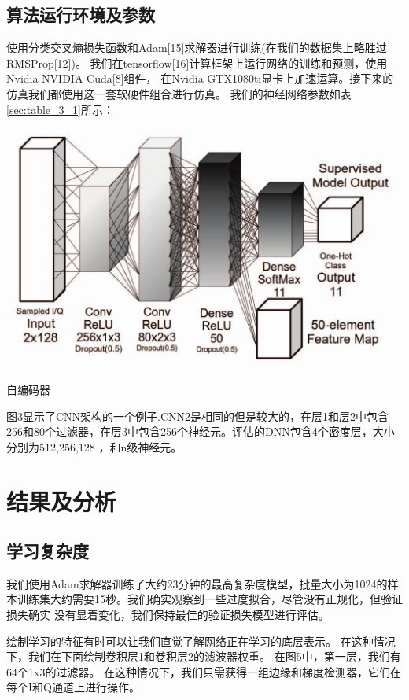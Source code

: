 \subsection{算法运行环境及参数}
使用分类交叉熵损失函数和Adam[15]求解器进行训练(在我们的数据集上略胜过RMSProp[12])。
我们在tensorflow[16]计算框架上运行网络的训练和预测，使用Nvidia NVIDIA Cuda[8]组件，
在Nvidia GTX1080ti显卡上加速运算。接下来的仿真我们都使用这一套软硬件组合进行仿真。
我们的神经网络参数如表\ref{sec:table_3_1}所示：\par
\begin{table}[!h]
	\centering
	\includegraphics[scale=0.3]{figures/chapter_3/cae_cnn_frame}
	\caption{自编码器}	\label{sec:table_3_1}
\end{table}

图3显示了CNN架构的一个例子.CNN2是相同的但是较大的，在层1和层2中包含256和80个过滤器，在层3中包含256个神经元。评估的DNN包含4个密度层，大小分别为512,256,128 ，和n级神经元。\par

\section{结果及分析}

\subsection{学习复杂度}
我们使用Adam求解器训练了大约23分钟的最高复杂度模型，批量大小为1024的样本训练集大约需要15秒。我们确实观察到一些过度拟合，尽管没有正规化，但验证损失确实 没有显着变化，我们保持最佳的验证损失模型进行评估。\par

绘制学习的特征有时可以让我们直觉了解网络正在学习的底层表示。 在这种情况下，我们在下面绘制卷积层1和卷积层2的滤波器权重。 在图5中，第一层，我们有64个1x3的过滤器。 在这种情况下，我们只需获得一组边缘和梯度检测器，它们在每个I和Q通道上进行操作。\par

